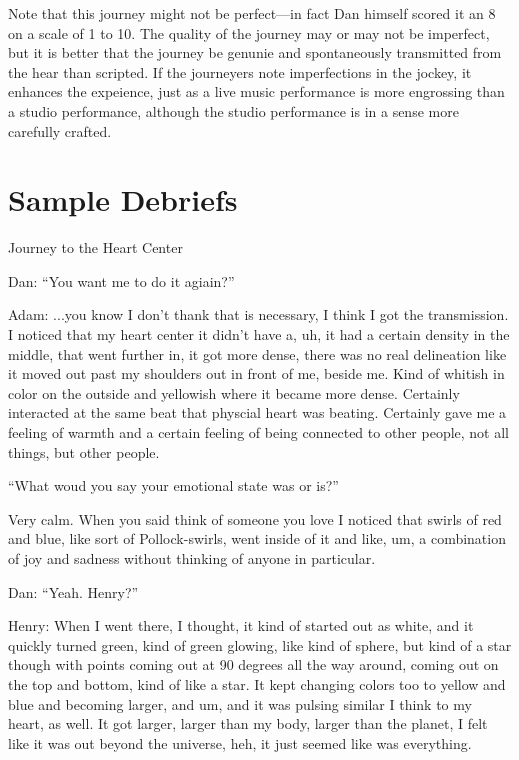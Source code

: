 \documentclass[12pt]{book}
\begin{document}
\hrulefill

Note that this journey might not be perfect---in fact Dan himself
scored it an 8 on a scale of 1 to 10. The quality of the journey
may or may not be imperfect, but it is better that the
journey be genunie and spontaneously transmitted from the
hear than scripted. If the journeyers note imperfections
in the jockey, it enhances the expeience, just as a live
music performance is more engrossing than a studio performance,
although the studio performance is in a sense more carefully crafted.

\chapter{Sample Debriefs}


Journey to the Heart Center

Dan: ``You want me to do it agiain?''

Adam: ...you know I don't thank that is necessary, I think I got the transmission.
I noticed that my heart center it didn't have a, uh, it had a
certain density in the middle, that went further in, it got more dense,
there was no real delineation like it moved out past my shoulders
out in front of me, beside me.
Kind of whitish in color on the outside and yellowish where it became more
dense. Certainly interacted at the same beat that physcial heart was
beating. Certainly gave me a feeling of warmth and a certain feeling of being
connected to other people, not all things, but other people.

``What woud you say your emotional state was or is?''

Very calm. When you said think of someone you love I noticed
that swirls of red and blue, like sort of Pollock-swirls,
went inside of it and like, um, a combination of joy and
sadness without thinking of anyone in particular.

Dan: ``Yeah. Henry?''

Henry: When I went there, I thought, it kind of started out as white,
and it quickly turned green, kind of green glowing, like kind
of sphere, but kind of a star though with points coming out at
90 degrees all the way around,  coming out on the top and bottom, kind of like a star.
It kept changing colors too to yellow and blue and becoming larger, and um,
and it was pulsing similar I think to my heart, as well. It got larger,
larger than my body, larger than the planet, I felt like it was out
beyond the universe, heh, it just seemed like was everything.
\end{document}

